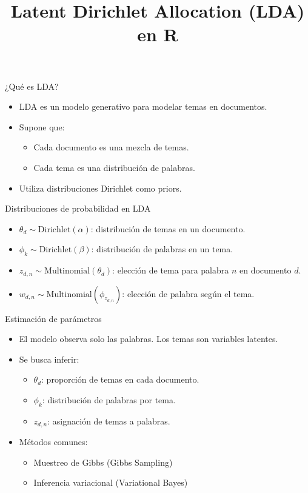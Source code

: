 \documentclass{beamer}
\title{Latent Dirichlet Allocation (LDA) en R}
\author{}
\date{}
\begin{document}
\begin{frame}
  \titlepage
\end{frame}

\begin{frame}{¿Qué es LDA?}
  \begin{itemize}
    \item LDA es un modelo generativo para modelar temas en documentos.
    \item Supone que:
    \begin{itemize}
      \item Cada documento es una mezcla de temas.
      \item Cada tema es una distribución de palabras.
    \end{itemize}
    \item Utiliza distribuciones Dirichlet como priors.
  \end{itemize}
\end{frame}

\begin{frame}{Distribuciones de probabilidad en LDA}
  \begin{itemize}
    \item \( \theta_d \sim \text{Dirichlet}(\alpha) \): distribución de temas en un documento.
    \item \( \phi_k \sim \text{Dirichlet}(\beta) \): distribución de palabras en un tema.
    \item \( z_{d,n} \sim \text{Multinomial}(\theta_d) \): elección de tema para palabra \( n \) en documento \( d \).
    \item \( w_{d,n} \sim \text{Multinomial}(\phi_{z_{d,n}}) \): elección de palabra según el tema.
  \end{itemize}
\end{frame}

\begin{frame}{Estimación de parámetros}
  \begin{itemize}
    \item El modelo observa solo las palabras. Los temas son variables latentes.
    \item Se busca inferir:
    \begin{itemize}
      \item \( \theta_d \): proporción de temas en cada documento.
      \item \( \phi_k \): distribución de palabras por tema.
      \item \( z_{d,n} \): asignación de temas a palabras.
    \end{itemize}
    \item Métodos comunes:
    \begin{itemize}
      \item Muestreo de Gibbs (Gibbs Sampling)
      \item Inferencia variacional (Variational Bayes)
    \end{itemize}
  \end{itemize}
\end{frame}
\end{document}
